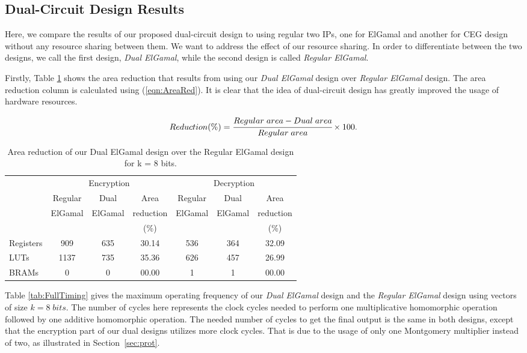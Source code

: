 \documentclass[conference]{IEEEtran}
\begin{document}
\subsection{Dual-Circuit Design Results}

Here, we compare the results of our proposed dual-circuit design to using regular two IPs, one for ElGamal and another for CEG design without any resource sharing between them. We want to address the effect of our resource sharing. In order to differentiate between the two designs, we call the first design, \textit{Dual ElGamal}, while the second design is called \textit{Regular ElGamal}.    

Firstly, Table \ref{tab:FullRes} shows the area reduction that results from using our \textit{Dual ElGamal} design over \textit{Regular ElGamal} design. The area reduction column is calculated using (\ref{eqn:AreaRed}). It is clear that the idea of dual-circuit design has greatly improved the usage of hardware resources.


\begin{equation}
Reduction (\%) = \cfrac{Regular \; area - Dual \; area}{Regular\; area} \times 100.
\label{eqn:AreaRed}
\end{equation}
 
\begin{table}[b]
  \centering
  \caption{Area reduction of our Dual ElGamal design over the Regular ElGamal design for k = 8 bits.}
    \tabcolsep=0.11cm 
\begin{tabular}{|l||c|c|c||c|c|c|}
    \toprule
                    & \multicolumn{3}{c}{Encryption}  & \multicolumn{3}{c}{Decryption} \vline \\
    & Regular & Dual    & Area      & Regular & Dual    & Area      \\
    & ElGamal & ElGamal & reduction & ElGamal & ElGamal & reduction \\
    &         &         &   (\%)    &         &         &   (\%) \\
    \midrule
    Registers & 909   & 635   & 30.14 & 536   & 364   & 32.09 \\
    LUTs      & 1137  & 735   & 35.36 & 626   & 457   & 26.99 \\
    BRAMs     & 0     & 0     & 00.00 & 1     & 1     & 00.00 \\
    \bottomrule 
    \end{tabular}\label{tab:FullRes}\end{table}
Table \ref{tab:FullTiming} gives the maximum operating frequency of our \textit{Dual ElGamal} design and the \textit{Regular ElGamal} design using vectors of size $k = 8 \; bits$. The number of cycles here represents the clock cycles needed to perform one multiplicative homomorphic operation followed by one additive homomorphic operation. The needed number of cycles to get the final output is the same in both designs, except that the encryption part of our dual designs utilizes more clock cycles. That is due to the usage of only one Montgomery multiplier instead of two, as illustrated in Section~\ref{sec:prot}. 
\end{document}
